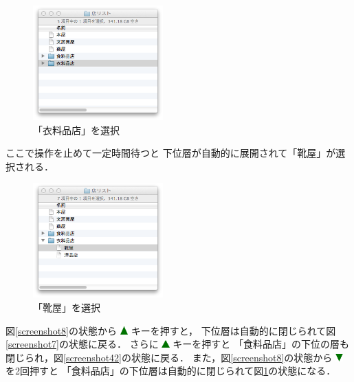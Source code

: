 \documentclass[twoside]{wiss}
\def\figwidth{50mm}
\def\up{ \includegraphics[width=3mm,bb=0 0 36 36]{figures/uptriangle.pdf} }
\def\down{ \includegraphics[width=3mm,bb=0 0 36 36]{figures/downtriangle.pdf} }
\begin{document}
\begin{figure}[H]
\centerline{\includegraphics[width=\figwidth,bb=0 0 344 304]{figures/c5c757d8f79d5a8a9c85eef25600ba66.png}}
\caption{「衣料品店」を選択}
\label{screenshot9}
\end{figure}

\noindent
ここで操作を止めて一定時間待つと
下位層が自動的に展開されて「靴屋」が選択される．

\begin{figure}[H]
\centerline{\includegraphics[width=\figwidth,bb=0 0 344 304]{figures/fddd5777d39924ea3f0220ae39a604c1.png}}
\caption{「靴屋」を選択}
\label{screenshot10}
\end{figure}

図\ref{screenshot8}の状態から{\up}キーを押すと，
下位層は自動的に閉じられて図\ref{screenshot7}の状態に戻る． 
さらに{\up}キーを押すと
「食料品店」の下位の層も閉じられ，図\ref{screenshot42}の状態に戻る．
%
また，図\ref{screenshot8}の状態から{\down}を2回押すと
「食料品店」の下位層は自動的に閉じられて図\ref{screenshot9}の状態になる．
\end{document}
